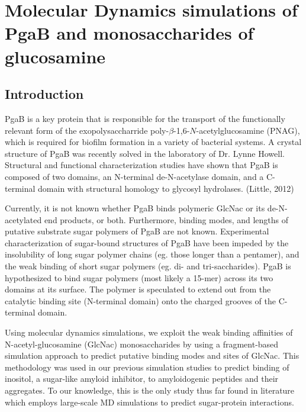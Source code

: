 \chapter[PgaB]{Molecular Dynamics simulations of PgaB and monosaccharides of glucosamine}

\section{Introduction}

PgaB is a key protein that is responsible for the transport of the functionally relevant form of the exopolysaccharride poly-$\beta$-1,6-$N$-acetylglucosamine (PNAG), which is required for biofilm formation in a variety of bacterial systems. A crystal structure of PgaB was recently solved in the laboratory of Dr. Lynne Howell. Structural and functional characterization studies have shown that PgaB is composed of two domains, an N-terminal de-N-acetylase domain, and a C-terminal domain with structural homology to glycosyl hydrolases. (Little, 2012)

Currently, it is not known whether PgaB binds polymeric GlcNac or its de-N-acetylated end products, or both. Furthermore, binding modes, and lengths of putative substrate sugar polymers of PgaB are not known. Experimental characterization of sugar-bound structures of PgaB have been impeded by the insolubility of long sugar polymer chains (eg. those longer than a pentamer), and the weak binding of short sugar polymers (eg. di- and tri-saccharides). PgaB is hypothesized to bind sugar polymers (most likely a 15-mer) across its two domains at its surface. The polymer is speculated to extend out from the catalytic binding site (N-terminal domain) onto the charged grooves of the C-terminal domain.

Using molecular dynamics simulations, we exploit the weak binding affinities of N-acetyl-glucosamine (GlcNac) monosaccharides by using a fragment-based simulation approach to predict putative binding modes and sites of GlcNac. This methodology was used in our previous simulation studies to predict binding of inositol, a sugar-like amyloid inhibitor, to amyloidogenic peptides and their aggregates. To our knowledge, this is the only study thus far found in literature which employs large-scale MD simulations to predict sugar-protein interactions.

